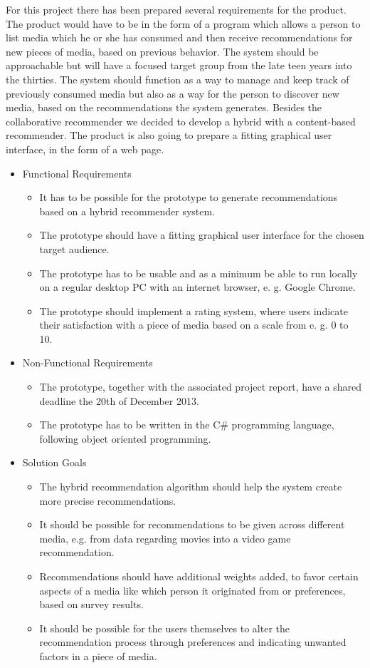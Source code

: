 For this project there has been prepared several requirements for the product. The product would have to be in the form of a program which allows a person to list media which he or she has consumed and then receive recommendations for new pieces of media, based on previous behavior. The system should be approachable but will have a focused target group from the late teen years into the thirties. The system should function as a way to manage and keep track of previously consumed media but also as a way for the person to discover new media, based on the recommendations the system generates. Besides the collaborative recommender we decided to develop a hybrid with a content-based recommender. The product is also going to prepare a fitting graphical user interface, in the form of a web page.

\begin{itemize}
	\item Functional Requirements
	\begin{itemize}
		\item It has to be possible for the prototype to generate recommendations based on a hybrid recommender system.
		\item The prototype should have a fitting graphical user interface for the chosen target audience.
		\item The prototype has to be usable and as a minimum be able to run locally on a regular desktop PC with an internet browser, e. g. Google Chrome.
		\item The prototype should implement a rating system, where users indicate their satisfaction with a piece of media based on a scale from e. g. 0 to 10.
	\end{itemize}
	\item Non-Functional Requirements
	\begin{itemize}
		\item The prototype, together with the associated project report, have a shared deadline the 20th of December 2013.
		\item The prototype has to be written in the C\# programming language, following object oriented programming.
	\end{itemize}
	\item Solution Goals
	\begin{itemize}
		\item The hybrid recommendation algorithm should help the system create more precise recommendations.
		\item It should be possible for recommendations to be given across different media, e.g. from data regarding movies into a video game recommendation.
		\item Recommendations should have additional weights added, to favor certain aspects of a media like which person it originated from or preferences, based on survey results.
		\item It should be possible for the users themselves to alter the recommendation process through preferences and indicating unwanted factors in a piece of media.
	\end{itemize}
\end{itemize}